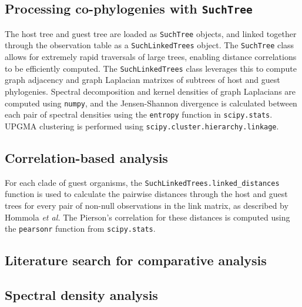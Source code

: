 \subsection{Processing co-phylogenies with {\tt SuchTree}}

The host tree and guest tree are loaded as {\tt SuchTree} objects, and linked together through the observation table as a {\tt SuchLinkedTrees} object. The {\tt SuchTree} class allows for extremely rapid traversals of large trees, enabling distance correlations to be efficiently computed. The {\tt SuchLinkedTrees} class leverages this to compute graph adjacency and graph Laplacian matrixes of subtrees of host and guest phylogenies. Spectral decomposition and kernel densities of graph Laplacians are computed using {\tt numpy}, and the Jensen-Shannon divergence is calculated between each pair of spectral densities using the {\tt entropy} function in {\tt scipy.stats}. UPGMA clustering is performed using {\tt scipy.cluster.hierarchy.linkage}.

\subsection{Correlation-based analysis}

For each clade of guest organisms, the {\tt SuchLinkedTrees.linked\_distances} function is used to calculate the pairwise distances through the host and guest trees for every pair of non-null observations in the link matrix, as described by Hommola {\em et al.} \cite{hommola2009permutation} The Pierson's correlation for these distances is computed using the {\tt pearsonr} function from {\tt scipy.stats}.

\subsection{Literature search for comparative analysis}

\subsection{Spectral density analysis}